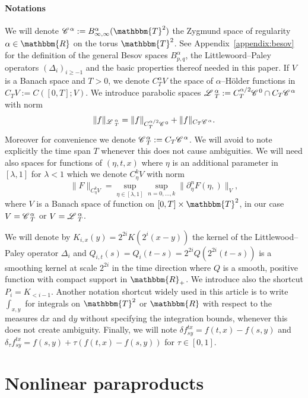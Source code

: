 \documentclass[11pt,reqno]{amsart}
\newcommand{\assign}{:=}
\newcommand{\mathd}{\mathrm{d}}
\newcommand{\CC}{\mathscr{C} \hspace{.1em}}
\newcommand{\LL}{\mathscr{L} \hspace{.2em}}
\begin{document}
\

\paragraph{Notations}We will denote $\CC^{\alpha} \assign B^{\alpha}_{\infty,
\infty} (\mathbbm{T}^2)$ the Zygmund space of regularity $\alpha \in
\mathbbm{R}$ on the torus $\mathbbm{T}^2$. See Appendix~\ref{appendix:besov}
for the definition of the general Besov spaces $B^{\alpha}_{p, q}$, the
Littlewoord--Paley operators $(\Delta_i)_{i \geqslant - 1}$ and the basic
properties thereof needed in this paper. If $V$ is a Banach space and $T > 0$,
we denote $C_T^{\alpha} V$ the space of $\alpha$--H{\"o}lder functions in $C_T
V \assign C ([0, T] ; V)$. We introduce parabolic spaces $\LL^{\alpha}_T
\assign C_T^{\alpha / 2} \CC^0 \cap C_T \CC^{\alpha}$ with norm
\[ \| f \|_{\LL^{\alpha}_T} = \| f \|_{C_T^{\alpha / 2} \CC^0} + \| f \|_{C_T
   \CC^{\alpha}} . \]
Moreover for convenience we denote $\CC_T^{\alpha} \assign C_T \CC^{\alpha}$.
We will avoid to note explicitly the time span $T$ whenever this does not
cause ambiguities. We will need also spaces for functions of $(\eta, t, x)$
where $\eta$ is an additional parameter in $[\lambda, 1]$ for $\lambda < 1$
which we denote $C_{\eta}^k V$ with norm
\[ \| F \|_{C_{\eta}^k V} = \sup_{\eta \in [\lambda, 1]} \sup_{n = 0, \ldots,
   k} \| \partial_{\eta}^n F (\eta,) \|_V, \]
where $V$ is a Banach space of function on $[0, T] \times \mathbbm{T}^2$, in
our case $V = \CC_T^{\alpha}$ or $V = \LL^{\alpha}_T$.

We will denote by $K_{i, x} (y) = 2^{2 i} K (2^i (x - y))$ the kernel of the
Littlewood--Paley operator $\Delta_i$ and $Q_{i, t} (s) = Q_i (t - s) = 2^{2
i} Q (2^{2 i} (t - s))$ is a smoothing kernel at scale $2^{2 i}$ in the time
direction where $Q$ is a smooth, positive function with compact support in
$\mathbbm{R}_+$. We introduce also the shortcut $P_i = K_{< i - 1}$. Another
notation shortcut widely used in this article is to write $\int_{x, y}$ for
integrals on $\mathbbm{T}^2$ or $\mathbbm{R}$ with respect to the measures
$\mathd x$ and $\mathd y$ without specifying the integration bounds, whenever
this does not create ambiguity. Finally, we will note $\delta f^{t x}_{s y} =
f (t, x) - f (s, y)$ and $\delta_{\tau} f_{s y}^{t x} = f (s, y) + \tau (f (t,
x) - f (s, y))$ for $\tau \in [0, 1]$.

\section{Nonlinear paraproducts}\label{s:nonlinear}
\end{document}
